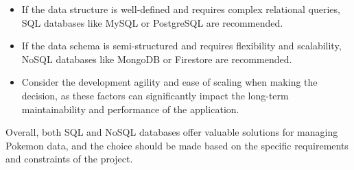 \documentclass{article}
\begin{document}
\begin{itemize}
    \item If the data structure is well-defined and requires complex relational queries, SQL databases like MySQL or PostgreSQL are recommended.
    \item If the data schema is semi-structured and requires flexibility and scalability, NoSQL databases like MongoDB or Firestore are recommended.
    \item Consider the development agility and ease of scaling when making the decision, as these factors can significantly impact the long-term maintainability and performance of the application.
\end{itemize}

Overall, both SQL and NoSQL databases offer valuable solutions for managing Pokemon data, and the choice should be made based on the specific requirements and constraints of the project.
\end{document}

